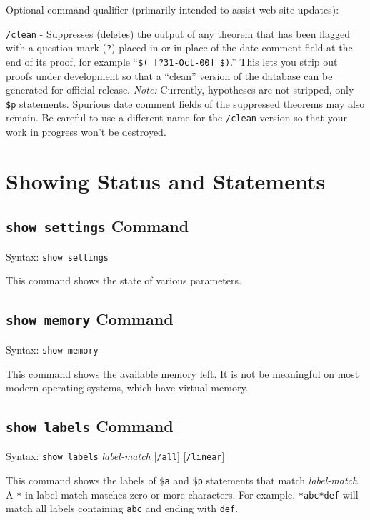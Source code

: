 Optional command qualifier (primarily intended to assist web site updates):

    \texttt{/clean} - Suppresses (deletes) the output of any theorem that
        has been flagged
        with a question mark (\texttt{?}) placed in or in place of the date
       comment field at the
        end of its proof, for example ``\texttt{\$( [?31-Oct-00] \$)}.''
        This lets
        you strip out proofs under development so that a ``clean''
        version of the database can be generated for official release.
        {\em Note:}  Currently, hypotheses are not stripped, only \texttt{\$p}
        statements.
        Spurious date comment fields of the suppressed theorems may also
        remain.  Be careful to use a different name for the \texttt{/clean}
        version so that your work in progress won't be destroyed.


\section{Showing Status and Statements}



\subsection{\texttt{show settings} Command}
Syntax:  \texttt{show settings}

This command shows the state of various parameters.

\subsection{\texttt{show memory} Command}
Syntax:  \texttt{show memory}

This command shows the available memory left.  It is not be meaningful
on most modern operating systems,
which have virtual memory.


\subsection{\texttt{show labels} Command}
Syntax:  \texttt{show labels} {\em label-match} [\texttt{/all}]
   [\texttt{/linear}]

This command shows the labels of \texttt{\$a} and \texttt{\$p}
statements that match {\em label-match}.  A \verb$*$ in {label-match}
matches zero or more characters.  For example, \verb$*abc*def$ will match all
labels containing \verb$abc$ and ending with \verb$def$.

